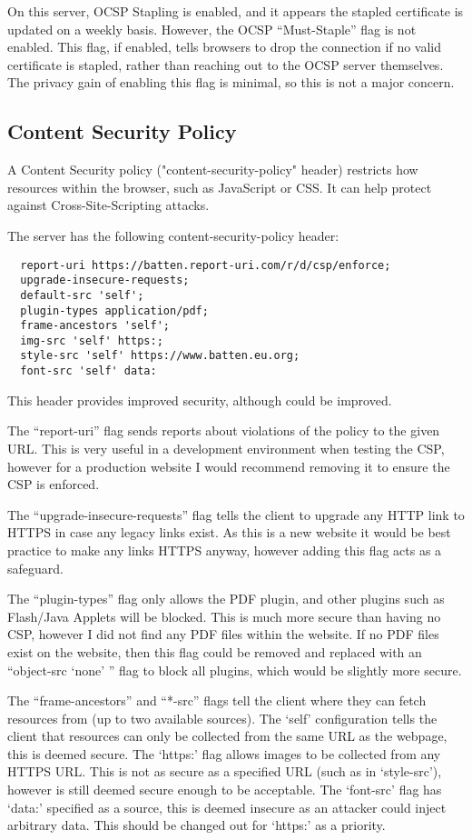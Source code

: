 \documentclass[12pt]{article}
\begin{document}
  On this server, OCSP Stapling is enabled, and it appears the stapled certificate is updated on a weekly basis.
  However, the OCSP ``Must-Staple'' flag is not enabled.
  This flag, if enabled, tells browsers to drop the connection if no valid certificate is stapled, rather than reaching out to the OCSP server themselves.
  The privacy gain of enabling this flag is minimal, so this is not a major concern.

  \subsection{Content Security Policy}
  A Content Security policy ("content-security-policy" header) restricts how resources within the browser, such as JavaScript or CSS.
  It can help protect against Cross-Site-Scripting attacks.

  The server has the following content-security-policy header:
  \begin{verbatim}
  report-uri https://batten.report-uri.com/r/d/csp/enforce; 
  upgrade-insecure-requests; 
  default-src 'self'; 
  plugin-types application/pdf; 
  frame-ancestors 'self'; 
  img-src 'self' https:; 
  style-src 'self' https://www.batten.eu.org; 
  font-src 'self' data:
  \end{verbatim}

  This header provides improved security, although could be improved.

  The ``report-uri'' flag sends reports about violations of the policy to the given URL.
  This is very useful in a development environment when testing the CSP, however for a production website I would recommend removing it to ensure the CSP is enforced.

  The ``upgrade-insecure-requests'' flag tells the client to upgrade any HTTP link to HTTPS in case any legacy links exist.
  As this is a new website it would be best practice to make any links HTTPS anyway, however adding this flag acts as a safeguard.

  The ``plugin-types'' flag only allows the PDF plugin, and other plugins such as Flash/Java Applets will be blocked.
  This is much more secure than having no CSP, however I did not find any PDF files within the website.
  If no PDF files exist on the website, then this flag could be removed and replaced with an ``object-src `none' '' flag to block all plugins, which would be slightly more secure.

  The ``frame-ancestors'' and ``*-src'' flags tell the client where they can fetch resources from (up to two available sources).
  The `self' configuration tells the client that resources can only be collected from the same URL as the webpage, this is deemed secure.
  The `https:' flag allows images to be collected from any HTTPS URL.
  This is not as secure as a specified URL (such as in `style-src'), however is still deemed secure enough to be acceptable.
  The `font-src' flag has `data:' specified as a source, this is deemed insecure as an attacker could inject arbitrary data.
  This should be changed out for `https:' as a priority.
\end{document}
